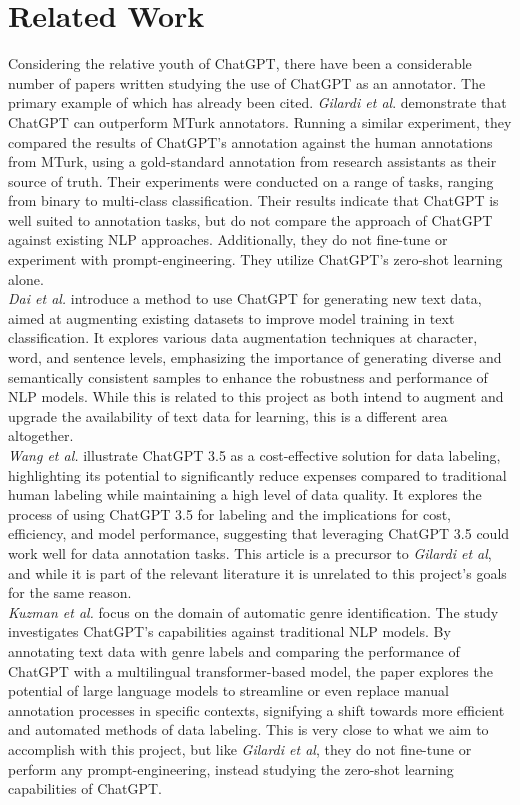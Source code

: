 \documentclass[12pt,a4paper]{article}
\begin{document}
\section{Related Work}\label{sec5}

\noindent Considering the relative youth of ChatGPT, there have been a considerable number of papers written studying the use of ChatGPT as an annotator. The primary example of which has already been cited. \textit{Gilardi et al}. demonstrate that ChatGPT can outperform MTurk annotators. Running a similar experiment, they compared the results of ChatGPT's annotation against the human annotations from MTurk, using a gold-standard annotation from research assistants as their source of truth. Their experiments were conducted on a range of tasks, ranging from binary to multi-class classification. Their results indicate that ChatGPT is well suited to annotation tasks, but do not compare the approach of ChatGPT against existing NLP approaches. Additionally, they do not fine-tune or experiment with prompt-engineering. They utilize ChatGPT's zero-shot learning alone. \\

\noindent \textit{Dai et al.} introduce a method to use ChatGPT for generating new text data, aimed at augmenting existing datasets to improve model training in text classification. It explores various data augmentation techniques at character, word, and sentence levels, emphasizing the importance of generating diverse and semantically consistent samples to enhance the robustness and performance of NLP models. While this is related to this project as both intend to augment and upgrade the availability of text data for learning, this is a different area altogether.\\ 

\noindent \textit{Wang et al.} illustrate ChatGPT 3.5 as a cost-effective solution for data labeling, highlighting its potential to significantly reduce expenses compared to traditional human labeling while maintaining a high level of data quality. It explores the process of using ChatGPT 3.5 for labeling and the implications for cost, efficiency, and model performance, suggesting that leveraging ChatGPT 3.5 could work well for data annotation tasks. This article is a precursor to \textit{Gilardi et al}, and while it is part of the relevant literature it is unrelated to this project's goals for the same reason.\\ 

\noindent \textit{Kuzman et al.} focus on the domain of automatic genre identification. The study investigates ChatGPT's capabilities against traditional NLP models. By annotating text data with genre labels and comparing the performance of ChatGPT with a multilingual transformer-based model, the paper explores the potential of large language models to streamline or even replace manual annotation processes in specific contexts, signifying a shift towards more efficient and automated methods of data labeling. This is very close to what we aim to accomplish with this project, but like \textit{Gilardi et al}, they do not fine-tune or perform any prompt-engineering, instead studying the zero-shot learning capabilities of ChatGPT.\\
\end{document}
